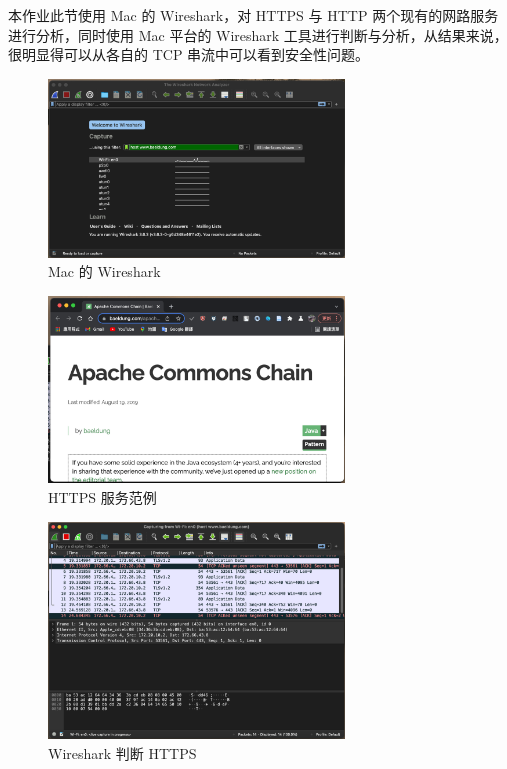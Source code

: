 本作业此节使用 Mac 的 Wireshark，对 HTTPS 与 HTTP 两个现有的网路服务进行分析，同时使用 Mac 平台的 Wireshark 工具进行判断与分析，从结果来说，很明显得可以从各自的 TCP 串流中可以看到安全性问题。

\begin{figure}[htb]
\centering 
\includegraphics[width=0.70\textwidth]{img/ch1s4m1.png} 
\caption{Mac 的 Wireshark}
\label{Test}
\end{figure}

\begin{figure}[htb]
\centering 
\includegraphics[width=0.70\textwidth]{img/ch1s4m2.png} 
\caption{HTTPS 服务范例}
\label{Test}
\end{figure}

\begin{figure}[htb]
\centering 
\includegraphics[width=0.70\textwidth]{img/ch1s4m3.png} 
\caption{Wireshark 判断 HTTPS}
\label{Test}
\end{figure}

